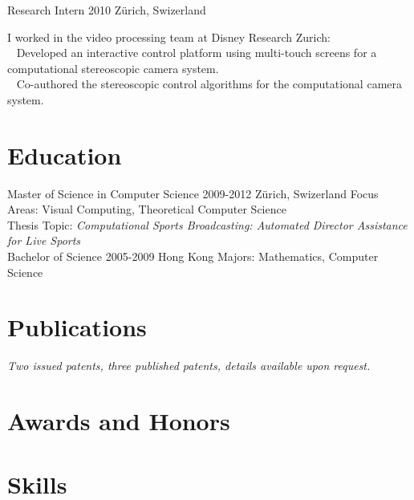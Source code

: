 \documentclass{kaeserchen_cv}
\begin{document}
                {Research Intern}
                {2010}
                {Z\"urich, Swizerland}

I worked in the video processing team at Disney Research Zurich: \\
\textbullet ~ Developed an interactive control platform using 
              multi-touch screens for a computational stereoscopic camera system. \\
\textbullet ~ Co-authored the stereoscopic control algorithms for the 
              computational camera system.

\section{Education}
               {Master of Science in Computer Science}
               {2009-2012}
               {Z\"urich, Swizerland}
               {Focus Areas: Visual Computing, Theoretical Computer Science \\
                Thesis Topic: \textit{Computational Sports Broadcasting: Automated Director 
                                      Assistance for Live Sports} \\}
\newline
{}
               {Bachelor of Science}
               {2005-2009}
               {Hong Kong}
               {Majors: Mathematics, Computer Science}

\section{Publications}
\begin{flushleft}
\begingroup
\renewcommand{\section}[2]{}
\makeatletter
\renewcommand\@biblabel[1]{\textbullet}
\makeatother
\setlength{\bibsep}{2pt}


\nocite{*}
\endgroup
\vspace{-0\baselineskip}
\end{flushleft}

\textit{Two issued patents, three published patents, details available upon
request.}

\section{Awards and Honors}
\begin{awardssection}
\end{awardssection}


\section{Skills}
\begin{skillssection}
\end{skillssection}
\end{document}
